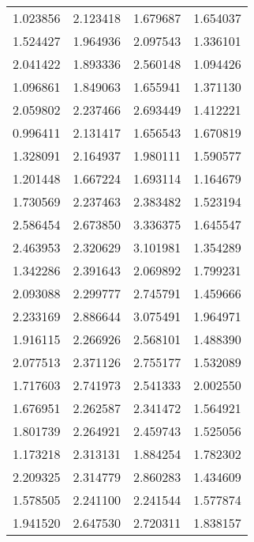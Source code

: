 \begin{longtable}{rrrr}
 1.023856 &        2.123418 &          1.679687 &                1.654037 \\
 1.524427 &        1.964936 &          2.097543 &                1.336101 \\
 2.041422 &        1.893336 &          2.560148 &                1.094426 \\
 1.096861 &        1.849063 &          1.655941 &                1.371130 \\
 2.059802 &        2.237466 &          2.693449 &                1.412221 \\
 0.996411 &        2.131417 &          1.656543 &                1.670819 \\
 1.328091 &        2.164937 &          1.980111 &                1.590577 \\
 1.201448 &        1.667224 &          1.693114 &                1.164679 \\
 1.730569 &        2.237463 &          2.383482 &                1.523194 \\
 2.586454 &        2.673850 &          3.336375 &                1.645547 \\
 2.463953 &        2.320629 &          3.101981 &                1.354289 \\
 1.342286 &        2.391643 &          2.069892 &                1.799231 \\
 2.093088 &        2.299777 &          2.745791 &                1.459666 \\
 2.233169 &        2.886644 &          3.075491 &                1.964971 \\
 1.916115 &        2.266926 &          2.568101 &                1.488390 \\
 2.077513 &        2.371126 &          2.755177 &                1.532089 \\
 1.717603 &        2.741973 &          2.541333 &                2.002550 \\
 1.676951 &        2.262587 &          2.341472 &                1.564921 \\
 1.801739 &        2.264921 &          2.459743 &                1.525056 \\
 1.173218 &        2.313131 &          1.884254 &                1.782302 \\
 2.209325 &        2.314779 &          2.860283 &                1.434609 \\
 1.578505 &        2.241100 &          2.241544 &                1.577874 \\
 1.941520 &        2.647530 &          2.720311 &                1.838157 \\

\end{longtable}
